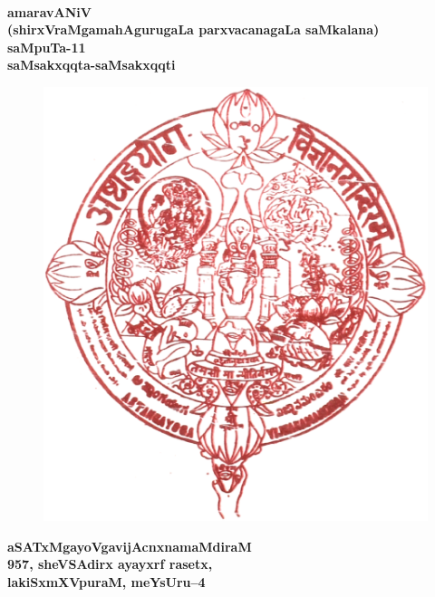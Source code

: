 
\thispagestyle{empty}
~\phantom{a}
\vfill

\begin{center}
{\Huge\bf amaravANiV}\\[15pt]
{\Large\bf (shirxVraMgamahAgurugaLa parxvacanagaLa saMkalana)}\\[15pt]
{\Large\bf saMpuTa-11}\\[15pt]
{\Huge\bf saMsakxqqta-saMsakxqqti}
\end{center}

\begin{figure}[h]
\centering
{\includegraphics[scale=.14]{0000a.eps}}
\end{figure}

\begin{center}
{\Huge\bf aSATxMgayoVgavijAcnxnamaMdiraM}\\[15pt]
{\Large\bf 957, sheVSAdirx ayayxrf rasetx,}\\[15pt]
{\Large\bf lakiSxmXVpuraM, meYsUru--4}
\end{center}

\vfill
\eject

\thispagestyle{empty}
~\phantom{a}


